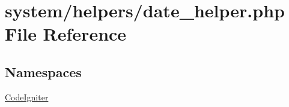 \hypertarget{date__helper_8php}{\section{system/helpers/date\-\_\-helper.php File Reference}
\label{date__helper_8php}
}
\subsection*{Namespaces}
\begin{DoxyCompactItemize}
\item 
\hyperlink{namespace_code_igniter}{Code\-Igniter}
\end{DoxyCompactItemize}
